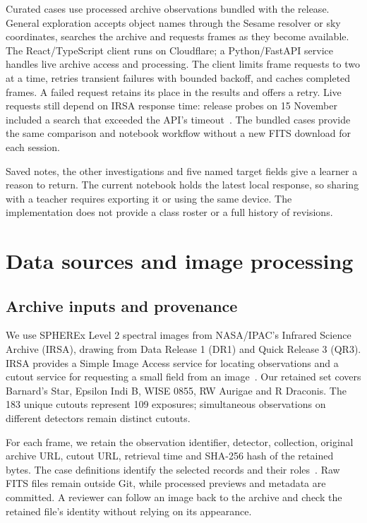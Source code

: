 \documentclass[11pt,letterpaper]{article}
\begin{document}
Curated cases use processed archive observations bundled with the release. General exploration accepts object names through the Sesame resolver or sky coordinates, searches the archive and requests frames as they become available. The React/TypeScript client runs on Cloudflare; a Python/FastAPI service handles live archive access and processing. The client limits frame requests to two at a time, retries transient failures with bounded backoff, and caches completed frames. A failed request retains its place in the results and offers a retry. Live requests still depend on IRSA response time: release probes on 15 November included a search that exceeded the API's timeout~\cite{release}. The bundled cases provide the same comparison and notebook workflow without a new FITS download for each session.

Saved notes, the other investigations and five named target fields give a learner a reason to return. The current notebook holds the latest local response, so sharing with a teacher requires exporting it or using the same device. The implementation does not provide a class roster or a full history of revisions.

\FloatBarrier
\section{Data sources and image processing}
\subsection{Archive inputs and provenance}
We use SPHEREx Level 2 spectral images from NASA/IPAC's Infrared Science Archive (IRSA), drawing from Data Release 1 (DR1) and Quick Release 3 (QR3). IRSA provides a Simple Image Access service for locating observations and a cutout service for requesting a small field from an image~\cite{irsa,access}. Our retained set covers Barnard's Star, Epsilon Indi B, WISE 0855, RW Aurigae and R Draconis. The 183 unique cutouts represent 109 exposures; simultaneous observations on different detectors remain distinct cutouts.

For each frame, we retain the observation identifier, detector, collection, original archive URL, cutout URL, retrieval time and SHA-256 hash of the retained bytes. The case definitions identify the selected records and their roles~\cite{cases}. Raw FITS files remain outside Git, while processed previews and metadata are committed. A reviewer can follow an image back to the archive and check the retained file's identity without relying on its appearance.
\end{document}

